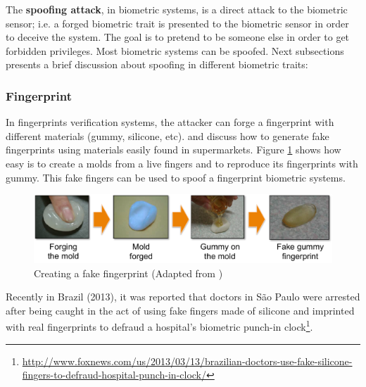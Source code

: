
The \textbf{spoofing attack}, in biometric systems, is a direct attack to the biometric sensor; i.e. a forged biometric trait is presented to the biometric sensor in order to deceive the system. The goal is to pretend to be someone else in order to get forbidden privileges. Most biometric systems can be spoofed. Next subsections presents a brief discussion about spoofing in different biometric traits:

\subsubsection{Fingerprint}

In fingerprints verification systems, the attacker can forge a fingerprint with different materials (gummy, silicone, etc). \cite{matsumoto2002impact} and \cite{leyden2002gummi} discuss how to generate fake fingerprints using materials easily found in supermarkets. Figure \ref{fig:finger_attack} shows how easy is to create a molds from a live fingers and to reproduce its fingerprints with gummy. This fake fingers can be used  to spoof a fingerprint biometric systems.

\begin{figure}[!htb]
\begin{center}
\includegraphics [width=16cm] {images/finger_print_attack.pdf}
\caption[Creating a fake fingerprint]{Creating a fake fingerprint (Adapted from \cite{matsumoto2002impact})} \label{fig:finger_attack}
\end{center}
\end{figure}

Recently in Brazil (2013), it was reported that doctors in S\~ao Paulo were arrested after being caught in the act of using fake fingers made of silicone and imprinted with real fingerprints to defraud a hospital's biometric punch-in clock\footnote{\url{http://www.foxnews.com/us/2013/03/13/brazilian-doctors-use-fake-silicone-fingers-to-defraud-hospital-punch-in-clock/}}.

